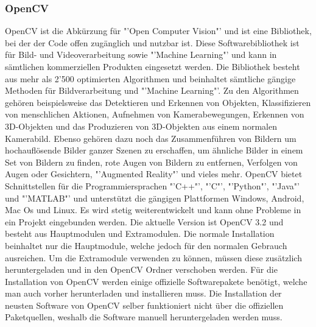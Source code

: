 \newpage
\subsubsection{OpenCV}
OpenCV ist die Abkürzung für "'Open Computer Vision"' und ist eine Bibliothek, bei der der Code offen zugänglich und nutzbar ist. Diese Softwarebibliothek ist für Bild- und Videoverarbeitung sowie "'Machine Learning"' und kann in sämtlichen kommerziellen Produkten eingesetzt werden. Die Bibliothek besteht aus mehr als 2'500 optimierten Algorithmen und beinhaltet sämtliche gängige Methoden für Bildverarbeitung und "'Machine Learning"'. Zu den Algorithmen gehören beispielsweise das Detektieren und Erkennen von Objekten, Klassifizieren von menschlichen Aktionen, Aufnehmen von Kamerabewegungen, Erkennen von 3D-Objekten und das Produzieren von 3D-Objekten aus einem normalen Kamerabild. Ebenso gehören dazu noch das Zusammenführen von Bildern um hochauflösende Bilder ganzer Szenen zu erschaffen, um ähnliche Bilder in einem Set von Bildern zu finden, rote Augen von Bildern zu entfernen, Verfolgen von Augen oder Gesichtern, "'Augmented Reality"' und vieles mehr. OpenCV bietet Schnittstellen für die Programmiersprachen "'C++"', "'C"', "'Python"', "'Java"' und "'MATLAB"' und unterstützt die gängigen Plattformen Windows, Android, Mac Os und Linux. Es wird stetig weiterentwickelt und kann ohne Probleme in ein Projekt eingebunden werden. Die aktuelle Version ist OpenCV 3.2 und besteht aus Hauptmodulen und Extramodulen. Die normale Installation beinhaltet nur die Hauptmodule, welche jedoch für den normalen Gebrauch ausreichen. Um die Extramodule verwenden zu können, müssen diese zusätzlich heruntergeladen und in den OpenCV Ordner verschoben werden. Für die Installation von OpenCV werden einige offizielle Softwarepakete benötigt, welche man auch vorher herunterladen und installieren muss. Die Installation der neusten Software von OpenCV selber funktioniert nicht über die offiziellen Paketquellen, weshalb die Software manuell heruntergeladen werden muss. \cite{OpenCV}

